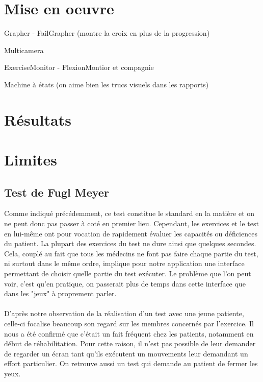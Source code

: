 \documentclass[french,12pt]{report}
\begin{document}
		\section{Mise en oeuvre} 	%

		Grapher
		- FailGrapher (montre la croix en plus de la progression)
		
		Multicamera
		
		ExerciseMonitor
		- FlexionMontior et compagnie
		
		Machine à états (on aime bien les trucs visuels dans les rapports)
		
		\section{Résultats}\label{resultats} %
		
		\section{Limites} \label{limites}%
			\subsection{Test de Fugl Meyer}
Comme indiqué précédemment, ce test constitue le standard en la matière et on ne peut donc pas passer à coté en premier lieu.
Cependant, les exercices et le test en lui-même ont pour vocation de rapidement évaluer les capacités ou déficiences
du patient. La plupart des exercices du test ne dure ainsi que quelques secondes. Cela, couplé au fait que tous les 
médecins ne font pas faire chaque partie du test, ni surtout dans le même ordre, implique pour notre application une interface permettant de choisir quelle partie du test exécuter. Le problème que l’on peut voir, c'est qu'en pratique, on passerait 
plus de temps dans cette interface que dans les "jeux" à proprement parler.

\paragraph{}
D'après notre observation de la réalisation d'un test avec une jeune patiente, celle-ci focalise 
beaucoup son regard sur les membres concernés par l'exercice. Il nous a été confirmé que c'était un fait fréquent
chez les patients, notamment en début de réhabilitation. Pour cette raison, il n'est pas possible de leur
demander de regarder un écran tant qu'ils exécutent un mouvements leur demandant un effort particulier.
On retrouve aussi un test qui demande au patient de fermer les yeux.
\end{document}
